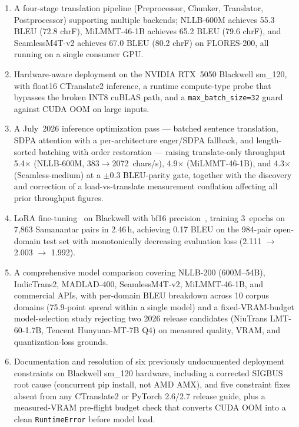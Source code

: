 \documentclass[conference]{IEEEtran}
\newcommand{\POSTFTBLEU}{0.17}
\newcommand{\TRAINDURATION}{2.46\,h}
\newcommand{\NLLBFLORESBLEU}{55.3}
\newcommand{\NLLBFLORESCHRF}{72.8}
\newcommand{\SEAMLESSPROJBLEU}{67.0}
\newcommand{\SEAMLESSPROJCHRF}{80.2}
\newcommand{\MILMMTFLORESBLEU}{65.2}
\newcommand{\MILMMTFLORESCHRF}{79.6}
\newcommand{\NLLBBEFORECHS}{383}
\newcommand{\NLLBAFTERCHS}{2072}
\newcommand{\NLLBSPEEDUP}{5.4$\times$}
\newcommand{\MILMMTSPEEDUP}{4.9$\times$}
\newcommand{\SEAMLESSSPEEDUP}{4.3$\times$}
\begin{document}
\begin{enumerate}
  \item A four-stage translation pipeline (Preprocessor, Chunker, Translator,
        Postprocessor) supporting multiple backends; NLLB-600M achieves \NLLBFLORESBLEU{}
        BLEU (\NLLBFLORESCHRF{} chrF), MiLMMT-46-1B achieves \MILMMTFLORESBLEU{} BLEU
        (\MILMMTFLORESCHRF{} chrF), and SeamlessM4T-v2 achieves \SEAMLESSPROJBLEU{}
        BLEU (\SEAMLESSPROJCHRF{} chrF) on FLORES-200, all running on a single consumer GPU.

  \item Hardware-aware deployment on the NVIDIA RTX~5050 Blackwell sm\_120, with
        float16 CTranslate2 inference, a runtime compute-type probe that bypasses
        the broken INT8 cuBLAS path, and a \texttt{max\_batch\_size=32} guard against
        CUDA OOM on large inputs.

  \item A July~2026 inference optimization pass --- batched sentence translation,
        SDPA attention with a per-architecture eager/SDPA fallback, and length-sorted
        batching with order restoration --- raising translate-only throughput
        \NLLBSPEEDUP{} (NLLB-600M, \NLLBBEFORECHS{}$\to$\NLLBAFTERCHS{}~chars/s),
        \MILMMTSPEEDUP{} (MiLMMT-46-1B), and \SEAMLESSSPEEDUP{} (Seamless-medium) at a
        $\pm$0.3 BLEU-parity gate, together with the discovery and correction of a
        load-vs-translate measurement conflation affecting all prior throughput figures.

  \item LoRA fine-tuning~\cite{hu2021lora} on Blackwell with bf16 precision~\cite{micikevicius2018mixed},
        training 3~epochs on 7,863 Samanantar pairs in \TRAINDURATION, achieving
        \POSTFTBLEU{} BLEU on the 984-pair open-domain test set with monotonically
        decreasing evaluation loss (2.111 $\to$ 2.003 $\to$ 1.992).

  \item A comprehensive model comparison covering NLLB-200 (600M--54B), IndicTrans2,
        MADLAD-400, SeamlessM4T-v2, MiLMMT-46-1B, and commercial APIs, with per-domain
        BLEU breakdown across 10 corpus domains (75.9-point spread within a single
        model) and a fixed-VRAM-budget model-selection study rejecting two 2026
        release candidates (NiuTrans LMT-60-1.7B, Tencent Hunyuan-MT-7B Q4) on
        measured quality, VRAM, and quantization-loss grounds.

  \item Documentation and resolution of six previously undocumented deployment
        constraints on Blackwell sm\_120 hardware, including a corrected SIGBUS
        root cause (concurrent pip install, not AMD AMX), and five constraint fixes
        absent from any CTranslate2 or PyTorch 2.6/2.7 release guide, plus a
        measured-VRAM pre-flight budget check that converts CUDA OOM into a clean
        \texttt{RuntimeError} before model load.
\end{enumerate}
\end{document}
